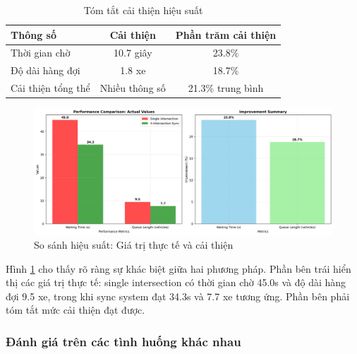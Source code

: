 \begin{table}[!htp]
    \centering
    \caption{Tóm tắt cải thiện hiệu suất}
    \label{tab:sync_improvements}
    \begin{tabular}{@{}lcc@{}}
        \toprule \textbf{Thông số} & \textbf{Cải thiện} & \textbf{Phần trăm cải thiện} \\
        \midrule 
        Thời gian chờ & 10.7 giây & 23.8\% \\
        Độ dài hàng đợi & 1.8 xe & 18.7\% \\
        Cải thiện tổng thể & Nhiều thông số & 21.3\% trung bình \\
        \bottomrule
    \end{tabular}
\end{table}

\begin{figure}[!htp]
    \centering
    \includegraphics[width=\textwidth]{figures/performance_comparison.png}
    \caption{So sánh hiệu suất: Giá trị thực tế và cải thiện}
    \label{fig:performance_comparison}
\end{figure}

Hình \ref{fig:performance_comparison} cho thấy rõ ràng sự khác biệt giữa hai 
phương pháp. Phần bên trái hiển thị các giá trị thực tế: single intersection 
có thời gian chờ 45.0s và độ dài hàng đợi 9.5 xe, trong khi sync system đạt 34.3s 
và 7.7 xe tương ứng. Phần bên phải tóm tắt mức cải thiện đạt được.

\subsubsection{Đánh giá trên các tình huống khác nhau}

